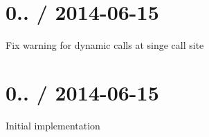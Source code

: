\section*{0.. / 2014-\/06-\/15 }


\begin{DoxyItemize}
\item Fix warning for dynamic calls at singe call site
\end{DoxyItemize}

\section*{0.. / 2014-\/06-\/15 }


\begin{DoxyItemize}
\item Initial implementation 
\end{DoxyItemize}
